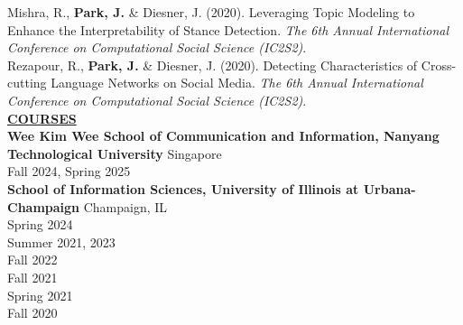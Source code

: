 \documentclass{article}
\begin{document}
\noindent Mishra, R., \textbf{Park, J.} \& Diesner, J. (2020). Leveraging Topic Modeling to Enhance the Interpretability of Stance Detection. \textit{The 6th Annual International Conference on Computational Social Science (IC2S2)}. \\

\noindent Rezapour, R., \textbf{Park, J.} \& Diesner, J. (2020). Detecting Characteristics of Cross-cutting Language Networks on Social Media. \textit{The 6th Annual International Conference on Computational Social Science (IC2S2)}. \\


\noindent \textbf{\underline{COURSES}} \\
\noindent \textbf{Wee Kim Wee School of Communication and Information, Nanyang Technological University} \hfill Singapore \\
 \hfill Fall 2024, Spring 2025 \\


\noindent \textbf{School of Information Sciences, University of Illinois at Urbana-Champaign} \hfill Champaign, IL \\
 \hfill Spring 2024 \\
 \hfill Summer 2021, 2023 \\
 \hfill Fall 2022 \\
 \hfill Fall 2021 \\
 \hfill Spring 2021 \\
 \hfill Fall 2020 \\

\end{document}
